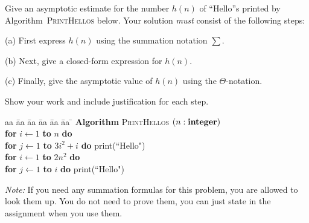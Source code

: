 \documentclass[11pt]{article}
\begin{document}
	

\medskip


\lineacross

\begin{problem}
	Give an asymptotic estimate  for the number $h(n)$ of ``Hello''s printed by Algorithm~\textsc{PrintHellos} below.
Your solution \emph{must} consist of the following steps:
%
\begin{description}
\item{(a)} First express $h(n)$ using the summation notation $\sum$.
\item{(b)} Next, give a closed-form expression
    for $h(n)$. 
\item{(c)}  Finally, give the asymptotic value of $h(n)$ using the $\Theta$-notation.
\end{description}
\noindent
Show your work and include justification for each step. 



\begin{tabbing}
aa \= aa \= aa \= aa \= aa \= aa \= \kill
\textbf{Algorithm} \textsc{PrintHellos} $(n: \mbox{\bf integer})$ \\
      \> \textbf{for} $i \leftarrow 1$ \textbf{to} $n$ \textbf{do} \\
      \> \> \textbf{for} $j \leftarrow 1$ \textbf{to} $3i^2+i$ \textbf{do} print(``Hello") \\
      \> \textbf{for} $i \leftarrow 1$ \textbf{to} $2n^2$
                         \textbf{do} \\
      \> \> \textbf{for} $j \leftarrow 1$ \textbf{to} $i$ \textbf{do}  print(``Hello") 
\end{tabbing}

\noindent
\emph{Note:} If you need any summation formulas for this problem, you are allowed to look them up. You do not need to
prove them, you can just state  in the assignment when you use them.
\end{problem}

\end{document}
